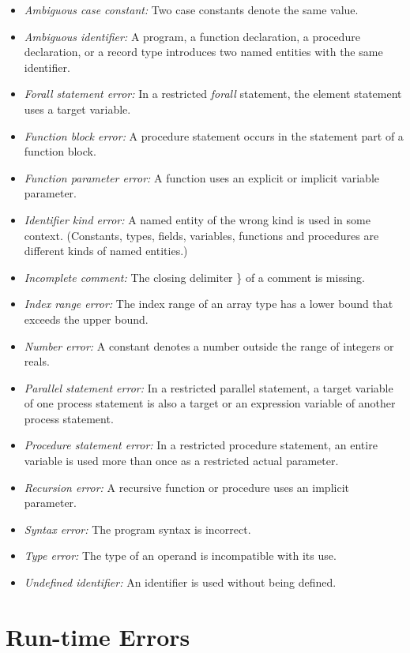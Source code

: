 \begin{itemize}
  \item
  {\it Ambiguous case constant:} Two case constants denote
  the same value.
  \item
  {\it Ambiguous identifier:} A program, a function
  declaration, a procedure declaration, or a record type
  introduces two named entities with the same identifier.
  \item
  {\it Forall statement error:} In a restricted {\it forall}
  statement, the element statement uses a target variable.
  \item
  {\it Function block error:} A procedure statement occurs
  in the statement part of a function block.
  \item
  {\it Function parameter error:} A function uses an
  explicit or implicit variable parameter.
  \item
  {\it Identifier kind error:} A named entity of the wrong
  kind is used in some context. (Constants, types, fields,
  variables, functions and procedures are different kinds of
  named entities.)
  \item
  {\it Incomplete comment:} The closing delimiter \} of a
  comment is missing.
  \item
  {\it Index range error:} The index range of an array type
  has a lower bound that exceeds the upper bound.
  \item
  {\it Number error:} A constant denotes a number outside
  the range of integers or reals.
  \item
  {\it Parallel statement error:} In a restricted parallel
  statement, a target variable of one process statement is
  also a target or an expression variable of another process
  statement.
  \item
  {\it Procedure statement error:} In a restricted procedure
  statement, an entire variable is used more than once as a
  restricted actual parameter.
  \item
  {\it Recursion error:} A recursive function or procedure
  uses an implicit parameter.
  \item
  {\it Syntax error:} The program syntax is incorrect.
  \item
  {\it Type error:} The type of an operand is incompatible
  with its use.
  \item
  {\it Undefined identifier:} An identifier is used without
  being defined.
\end{itemize}


\section{Run-time Errors}

